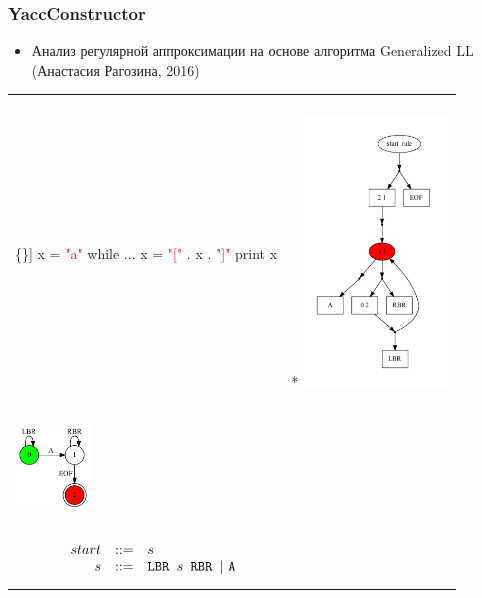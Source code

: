\documentclass{beamer}
\begin{document}
\begin{frame}[fragile]
	\transwipe[direction=90]
	\frametitle{YaccConstructor}
	\begin{itemize}
		\item Анализ регулярной аппроксимации на основе алгоритма Generalized LL (Анастасия Рагозина, 2016)
	\end{itemize}
		\begin{table}[h]
			\centering
			\begin{tabular}{p{4cm} p{6cm}}
				\begin{minipage}{3in}
					\begin{Verbatim}[commandchars=\\\{\}]
x = \textcolor{red}{"a"}
while ...
    x = \textcolor{red}{"["} . x . \textcolor{red}{"]"}
print x
					\end{Verbatim}
				\end{minipage}
				&
				\begin{center}
					\multirow{-4}*{\includegraphics[width=4cm]{pictures/sppf.pdf}}
				\end{center}
				\\
				\vspace{-10pt}
				\begin{center}
					\includegraphics[width=2cm]{pictures/reg_app.pdf}	
				\end{center}
				&
				\\
				\vspace{-20pt}
				$$
					\begin{array}{crcl}
						&start &::=& s \\
						&s & ::= & \mbox{\texttt{LBR }} s \mbox{\texttt{ RBR }} | \ \mbox{\texttt{A}}\\
					\end{array}
				$$
			\end{tabular}
		\end{table}
\end{frame}
\end{document}
